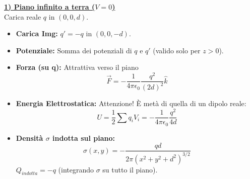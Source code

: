 \documentclass{book}
\begin{document}
\begin{minipage}[t]{0.48\textwidth}
    \underline{\textbf{1) Piano infinito a terra  ($V=0$)}} \\
Carica reale $q$ in $(0,0,d)$.
\begin{itemize}[leftmargin=*, noitemsep]
    \item \textbf{Carica Img:} $q' = -q$ in $(0,0,-d)$.
    \item \textbf{Potenziale:} Somma dei potenziali di $q$ e $q'$ (valido solo per $z>0$).
    \item \textbf{Forza (su q):} Attrattiva verso il piano
    $$ \vec{F} = -\frac{1}{4\pi\epsilon_0}\frac{q^2}{(2d)^2} \hat{k} $$
    \item \textbf{Energia Elettrostatica:} Attenzione! È metà di quella di un dipolo reale:
    $$ U = \frac{1}{2} \sum q_i V_i = -\frac{1}{4\pi\epsilon_0}\frac{q^2}{4d} $$
    \item \textbf{Densità $\sigma$ indotta sul piano:}
    $$ \sigma(x,y) = -\frac{q d}{2\pi (x^2+y^2+d^2)^{3/2}} $$
    $Q_{indotta} = -q$ (integrando $\sigma$ su tutto il piano).
\end{itemize}
\end{minipage}
\hfill \vrule \hfill %
\end{document}
